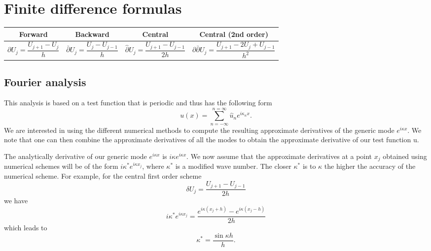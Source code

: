 \documentclass[oneside,a4paper,11pt]{report}
\begin{document}
\chapter{Finite difference formulas}
\begin{center}
\begin{tabular}{|c|c|c|c|}
\hline
Forward & Backward & Central & Central (2nd order)\\
\hline
\parbox{3cm}{\[\partial U_j = \frac{U_{j+1} - U_{j}}{h}\]} &
\parbox{3cm}{\[\bar{\partial} U_j = \frac{U_{j} - U_{j-1}}{h}\]} & 
\parbox{4cm}{\[\hat{\partial} U_j = \frac{U_{j+1} - U_{j-1}}{2h}\]} &
\parbox{5cm}{\[\partial \bar{\partial} U_j = \frac{U_{j+1} - 2U_j + U_{j-1}}{h^2}\]}\\
\hline
\end{tabular}
\end{center}

\section{Fourier analysis}
This analysis is based on a test function that is periodic and thus has the following form
\begin{equation}
    u(x) = \sum_{n = -\infty}^{n=\infty} \hat{u}_n e^{i \kappa_n x}.
\end{equation}
We are interested in using the different numerical methods to compute the resulting approximate derivatives of the generic mode $e^{i \kappa x}$. We note that one can then combine the approximate derivatives of all the modes to obtain the approximate derivative of our test function u.

The analytically derivative of our generic mode $e^{i\kappa x}$ is $i\kappa e^{i\kappa x}$. We now assume that the approximate derivatives at a point $x_j$ obtained using numerical schemes will be of the form $i\kappa^* e^{i\kappa x_j}$, where $\kappa^*$ is a modified wave number. The closer $\kappa^*$ is to $\kappa$ the higher the accuracy of the numerical scheme. For example, for the central first order scheme 
\begin{equation}
\delta U_j = \frac{ U_{j+1} - U_{j-1} }{ 2h }
\end{equation}
we have
\begin{equation}
    i\kappa^*e^{i\kappa x_j} = \frac{ e^{i\kappa (x_j+h) } - e^{ i \kappa (x_j-h)  } }{2h}
\end{equation}
which leads to
\begin{equation}
    \kappa^* = \frac{ \sin \kappa h }{h}.
\end{equation}
\end{document}
